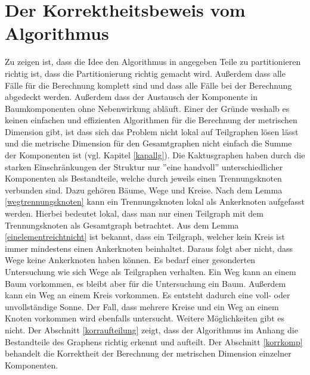 \section{Der Korrektheitsbeweis vom Algorithmus}
Zu zeigen ist, dass die Idee den Algorithmus in angegeben Teile zu partitionieren richtig ist, dass die Partitionierung richtig gemacht wird. Außerdem dass alle Fälle für die Berechnung komplett sind und dass alle Fälle bei der Berechnung abgedeckt werden. Außerdem dass der Austausch der Komponente in Baumkomponenten ohne Nebenwirkung abläuft.\newline\newline
Einer der Gründe weshalb es keinen einfachen und effizienten Algorithmen für die Berechnung der metrischen Dimension gibt, ist dass sich das Problem nicht lokal auf Teilgraphen lösen lässt und die metrische Dimension für den Gesamtgraphen nicht einfach die Summe der Komponenten ist (vgl. Kapitel \ref{kapallg}).\newline\newline
Die Kaktusgraphen haben durch die starken Einschränkungen der Struktur nur ''eine handvoll'' unterschiedlicher Komponenten als Bestandteile, welche durch jeweils einen Trennungsknoten verbunden sind. Dazu gehören Bäume, Wege und Kreise.\newline\newline
Nach dem Lemma \ref{wegtrennungsknoten} kann ein Trennungsknoten lokal als Ankerknoten aufgefasst werden. Hierbei bedeutet lokal, dass man nur einen Teilgraph mit dem Trennungsknoten als Gesamtgraph betrachtet. Aus dem Lemma \ref{einelementreichtnicht} ist bekannt, dass ein Teilgraph, welcher kein Kreis ist immer mindestens einen Ankerknoten beinhaltet. Daraus folgt aber nicht, dass Wege keine Ankerknoten haben können. Es bedarf einer gesonderten Untersuchung wie sich Wege als Teilgraphen verhalten. Ein Weg kann an einem Baum vorkommen, es bleibt aber für die Untersuchung ein Baum. Außerdem kann ein Weg an einem Kreis vorkommen. Es entsteht dadurch eine voll- oder unvollständige Sonne. Der Fall, dass mehrere Kreise und ein Weg an einem Knoten vorkommen wird ebenfalls untersucht. Weitere Möglichkeiten gibt es nicht. \newline
Der Abschnitt \ref{korraufteilung} zeigt, dass der Algorithmus im Anhang die Bestandteile des Graphens richtig erkennt und aufteilt. Der Abschnitt \ref{korrkomp} behandelt die Korrektheit der Berechnung der metrischen Dimension einzelner Komponenten.\newline\newline
